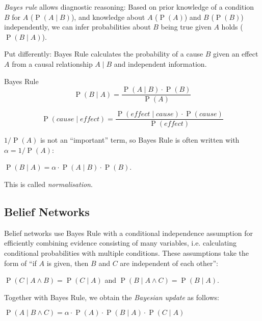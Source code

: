 \documentclass[english]{panikzettel}
\begin{document}
\begin{halfboxl}
\emph{Bayes rule} allows diagnostic reasoning:  Based on prior knowledge of a condition $B$ for $A$ (${\operatorname{P}(A \mid B)}$), and knowledge about $A$ ($\operatorname{P}(A)$) and $B$ ($\operatorname{P}(B)$) independently, we can infer probabilities about $B$ being true given $A$ holds ($\operatorname{P}(B \mid A)$).

Put differently: Bayes Rule calculates the probability of a cause $B$ given an effect $A$ from a causal relationship $A \mid B$ and independent information.
\end{halfboxl}%
\begin{halfboxr}
\vspace{-\baselineskip}
\begin{theo}{Bayes Rule}
\[\operatorname{P}(B\mid A) = \frac{\operatorname{P} (A\mid B) \cdot \operatorname{P}(B)} {\operatorname{P}(A)}\]

\footnotesize
\[\operatorname{P}(cause \mid effect) = \frac{\operatorname{P} (effect \mid cause) \cdot \operatorname{P}(cause)} {\operatorname{P}(effect)}\]
\end{theo}
\end{halfboxr}

$1/\operatorname{P}(A)$ is not an ``important'' term, so Bayes Rule is often written with $\alpha = 1/\operatorname{P}(A)$:
\begin{tightcenter}
$\operatorname{P}(B \mid A) = \alpha \cdot \operatorname{P}(A \mid B) \cdot \operatorname{P}(B)$.
\end{tightcenter}
This is called \emph{normalisation}.

\subsection{Belief Networks}

Belief networks use Bayes Rule with a conditional independence assumption for efficiently combining evidence consisting of many variables, i.e. calculating conditional probabilities with multiple conditions.
These assumptions take the form of ``if $A$ is given, then $B$ and $C$ are independent of each other'':
\begin{tightcenter}
$\operatorname{P}(C \mid A \land B) = \operatorname{P}(C \mid A)$ and $\operatorname{P}(B \mid A \land C) = \operatorname{P}(B \mid A)$.
\end{tightcenter}
Together with Bayes Rule, we obtain the \emph{Bayesian update} as follows:
\begin{tightcenter}
$\operatorname{P}(A \mid B \land C) = \alpha \cdot \operatorname{P}(A) \cdot \operatorname{P}(B \mid A) \cdot \operatorname{P}(C \mid A)$
\end{tightcenter}
\bigskip
\end{document}
